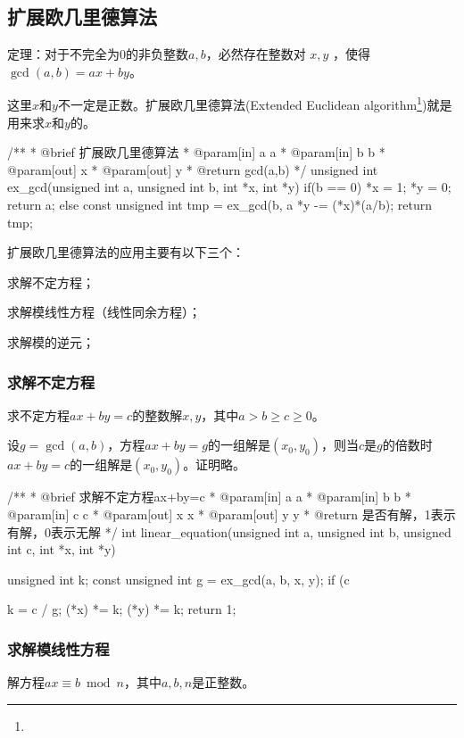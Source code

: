 \subsection{扩展欧几里德算法}
定理：对于不完全为$0$的非负整数$a,b$，必然存在整数对 $x,y$ ，使得 $\gcd(a,b)=ax+by$。

这里$x$和$y$不一定是正数。扩展欧几里德算法(Extended Euclidean algorithm\footnote{})就是用来求$x$和$y$的。

\begin{Codex}[label=ex_gcd.c]
/**
 * @brief 扩展欧几里德算法
 * @param[in] a a
 * @param[in] b b
 * @param[out] x
 * @param[out] y
 * @return gcd(a,b)
 */
unsigned int ex_gcd(unsigned int a, unsigned int b, int *x, int *y) {
    if(b == 0) {
        *x = 1; *y = 0; return a;
    } else {
        const unsigned int tmp = ex_gcd(b, a %
        *y -= (*x)*(a/b);
        return tmp;
    }
}
\end{Codex}

扩展欧几里德算法的应用主要有以下三个：
\begindot
\item 求解不定方程；
\item 求解模线性方程（线性同余方程）；
\item 求解模的逆元；
\myenddot


\subsubsection{求解不定方程}
求不定方程$ax+by=c$的整数解$x,y$，其中$a > b \geq c \geq 0$。

设$g=\gcd(a,b)$，方程$ax+by=g$的一组解是$(x_0,y_0)$，则当$c$是$g$的倍数时$ax+by=c$的一组解是$(x_0,y_0)$。证明略。

\begin{Code}
/**
 * @brief 求解不定方程ax+by=c
 * @param[in] a a
 * @param[in] b b
 * @param[in] c c
 * @param[out] x x
 * @param[out] y y
 * @return 是否有解，1表示有解，0表示无解
 */
int linear_equation(unsigned int a, unsigned int b, unsigned int c,
        int *x, int *y) {
    unsigned int k;
    const unsigned int g = ex_gcd(a, b, x, y);
    if (c %

    k = c / g;
    (*x) *= k; (*y) *= k;
    return 1;
}
\end{Code}


\subsubsection{求解模线性方程}
解方程$ax \equiv b\bmod n$，其中$a,b,n$是正整数。

